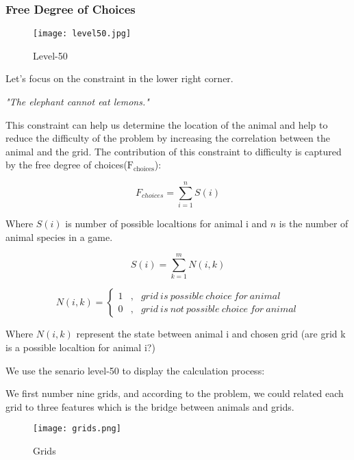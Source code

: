 \documentclass{mcmthesis}
\begin{document}
			\subsubsection{Free Degree of Choices}
			
				\begin{figure}[h]
					\small
					\centering
					\texttt{[image: level50.jpg]}
					\caption{Level-50} \label{fig:level50}
				\end{figure}
			
				Let's focus on the constraint in the lower right corner.
				
				\begin{center} 
					\emph{"The elephant cannot eat lemons."}
				\end{center}
			
				This constraint can help us determine the location of the animal and help to reduce the difficulty of the problem by increasing the correlation between the animal and the grid. The contribution of this constraint to difficulty is captured by the free degree of choices($\mathrm{F_{choices}}$):
				
				\begin{equation}
				F_{choices} = \sum_{i=1}^n S(i)
				\end{equation}
				
				Where $S(i)$ is number of possible localtions for animal i and $n$ is the number of animal species in a game.
				
				\begin{equation}
				S(i) = \sum_{k=1}^m N(i,k)
				\end{equation}
				
				$$ N(i,k)=\left\{
				\begin{aligned}
				1 & , & grid\ is\ possible\ choice\ for\ animal \\
				0 & , & grid\ is\ not\ possible\ choice\ for\ animal
				\end{aligned}
				\right.
				$$
				
				Where $N(i,k)$ represent the state between animal i and chosen grid (are grid k is a possible localtion for animal i?)
				
				We use the senario level-50 to display the calculation process:
				
				We first number nine grids, and according to the problem, we could related each grid to three features which is the bridge between animals and grids.
				
				\begin{figure}[h]
					\small
					\centering
					\texttt{[image: grids.png]}
					\caption{Grids} \label{fig:grids}
				\end{figure}
			
\end{document}
